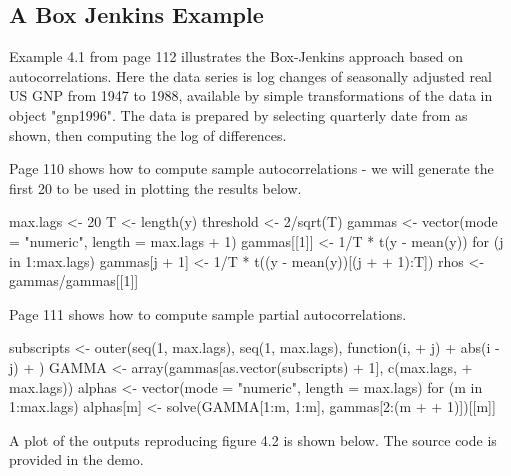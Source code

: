 \documentclass[a4paper]{article}
\renewcommand{\~}{\perispomeni}%
\begin{document}
\subsection{A Box Jenkins Example}
Example 4.1 from page 112 illustrates the Box-Jenkins
approach based on autocorrelations.  Here the data series is log changes
of seasonally adjusted real US GNP from 1947 to 1988,
available by simple transformations of the data in object "gnp1996".
The data is prepared by selecting quarterly date from as shown, then computing the log of differences.
\begin{Schunk}
\end{Schunk}
Page 110 shows how to compute sample autocorrelations - we will generate the first 20 to be used in plotting the results below.
\begin{Schunk}
\begin{Sinput}
 max.lags <- 20
 T <- length(y)
 threshold <- 2/sqrt(T)
 gammas <- vector(mode = "numeric", length = max.lags + 1)
 gammas[[1]] <- 1/T * t(y - mean(y)) %
 for (j in 1:max.lags) gammas[j + 1] <- 1/T * t((y - mean(y))[(j + 
+     1):T]) %
 rhos <- gammas/gammas[[1]]
\end{Sinput}
\end{Schunk}
Page 111 shows how to compute sample partial autocorrelations.  
\begin{Schunk}
\begin{Sinput}
 subscripts <- outer(seq(1, max.lags), seq(1, max.lags), function(i, 
+     j) {
+     abs(i - j)
+ })
 GAMMA <- array(gammas[as.vector(subscripts) + 1], c(max.lags, 
+     max.lags))
 alphas <- vector(mode = "numeric", length = max.lags)
 for (m in 1:max.lags) alphas[m] <- solve(GAMMA[1:m, 1:m], gammas[2:(m + 
+     1)])[[m]]
\end{Sinput}
\end{Schunk}
A plot of the outputs reproducing figure 4.2 is shown below.  The source code is provided in the demo.
\end{document}
